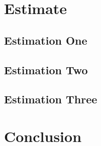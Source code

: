 \documentclass[12pt,english]{article}
\begin{document}
\section{Estimate}
\subsection{Estimation One}

\subsection{Estimation Two}

\subsection{Estimation Three}



\section{Conclusion}



\pagebreak

\pagebreak

\appendix
\end{document}
